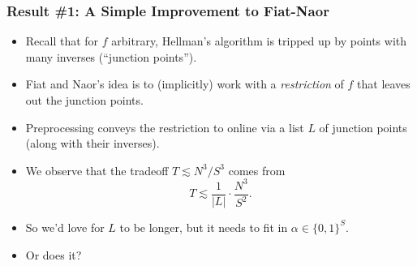 \documentclass[usenames, dvipsnames, t, table]{beamer}
\begin{document}
    \begin{frame}
    \frametitle{Result \#1: A Simple Improvement to Fiat-Naor}
    \begin{itemize}
    \item Recall that for $f$ arbitrary, Hellman's algorithm is tripped up by points with many inverses (``junction points'').
        \pause
      \item Fiat and Naor's idea is to (implicitly) work with a \emph{restriction} of $f$ that leaves out the junction points.
        \pause
      \item Preprocessing conveys the restriction to online via a list $L$ of junction points (along with their inverses).
         \pause
       \item We observe that the tradeoff $T \lesssim N^3 / S^3$ comes from
         \[T \lesssim \frac{1}{|L|} \cdot \frac{N^3}{S^2}.\] \mypause
         \item So we'd love for $L$ to be longer, but it needs to fit in $\alpha \in \{0, 1\}^S$.
           \pause
         \item Or does it?
    \end{itemize}
  \end{frame}
\end{document}
